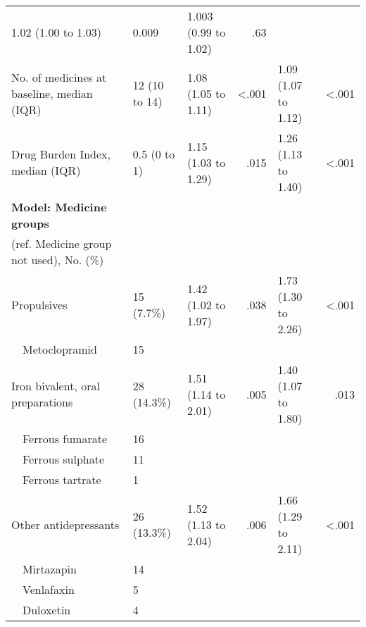 \begin{table}[]
{\begin{tabularx}{\textwidth}{
     XXXrXr
}
  1.02 (1.00 to 1.03) &
  0.009 &
  1.003 (0.99 to 1.02) &
  .63 \\
No. of medicines at baseline, median (IQR) &
  12 (10 to 14) &
  1.08 (1.05 to 1.11) &
  \textless .001 &
  1.09 (1.07 to 1.12) &
  \textless .001 \\
Drug Burden Index, median (IQR) &
  0.5 (0 to 1) &
  1.15 (1.03 to 1.29) &
  .015 &
  1.26 (1.13 to 1.40) &
  \textless .001 \\
\textbf{Model: Medicine   groups} &
  \multirow{2}{*}{} &
  \multirow{2}{*}{} &
  \multirow{2}{*}{} &
  \multirow{2}{*}{} &
  \multirow{2}{*}{} \\
(ref. Medicine   group not used), No. (\%) &             &                             &         &                           &                \\
Propulsives                                & 15 (7.7\%)  & 1.42 (1.02 to 1.97)         & .038    & 1.73 (1.30 to 2.26)       & \textless .001 \\
~~Metoclopramid                              & 15          &                             &         &                           &                \\
Iron bivalent, oral preparations           & 28 (14.3\%) & 1.51 (1.14 to 2.01)         & .005    & 1.40 (1.07 to 1.80)       & .013           \\
~~Ferrous fumarate                           & 16          &                             &         &                           &                \\
~~Ferrous sulphate                           & 11          &                             &         &                           &                \\
~~Ferrous tartrate                           & 1           &                             &         &                           &                \\
Other antidepressants                      & 26 (13.3\%) & 1.52 (1.13 to 2.04)         & .006    & 1.66 (1.29 to 2.11)       & \textless .001 \\
~~Mirtazapin                                 & 14          &                             &         &                           &                \\
~~Venlafaxin                                 & 5           &                             &         &                           &                \\
~~Duloxetin                                  & 4           &                             &         &                           &                \\

\end{tabularx}}
\end{table}
